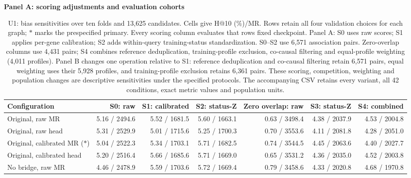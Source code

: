 \begin{landscape}
\begin{table}[p]
\centering\footnotesize
\setlength{\tabcolsep}{3pt}
\caption{U1: bias sensitivities over ten folds and 13,625 candidates. Cells give H@10 (\%)/MR. Rows retain all four validation choices for each graph; $\ast$ marks the prespecified primary. Every scoring column evaluates that row\textquotesingle s fixed checkpoint. Panel A: S0 uses raw scores; S1 applies per-gene calibration; S2 adds within-query training-status standardization. S0--S2 use 6,571 association pairs. Zero-overlap columns use 4,431 pairs; S4 combines reference deduplication, training-profile exclusion, co-causal filtering and equal-profile weighting (4,011 profiles). Panel B changes one operation relative to S1: reference deduplication and co-causal filtering retain 6,571 pairs, equal weighting uses their 5,928 profiles, and training-profile exclusion retains 6,361 pairs. These scoring, competition, weighting and population changes are descriptive sensitivities under the specified protocols. The accompanying CSV retains every variant, all 42 conditions, exact metric values and population units.}
\label{tab:matched_bias_U1}
\textbf{Panel A: scoring adjustments and evaluation cohorts}\par\smallskip
\begin{adjustbox}{max width=\linewidth}
\begin{tabular}{lrrrrrr}
\toprule
Configuration & S0: raw & S1: calibrated & S2: status-Z & Zero overlap: raw & S3: status-Z & S4: combined \\
\midrule
Original, raw MR & 5.16 / 2494.6 & 5.52 / 1681.5 & 5.60 / 1663.1 & 0.63 / 3498.4 & 4.38 / 2037.9 & 4.53 / 2004.8 \\
Original, raw head & 5.31 / 2529.9 & 5.01 / 1715.6 & 5.25 / 1700.3 & 0.70 / 3553.6 & 4.11 / 2081.8 & 4.28 / 2051.0 \\
Original, calibrated MR ($\ast$) & 5.04 / 2522.3 & 5.34 / 1703.1 & 5.71 / 1682.5 & 0.74 / 3544.5 & 4.45 / 2063.6 & 4.40 / 2027.7 \\
Original, calibrated head & 5.20 / 2516.4 & 5.66 / 1685.6 & 5.71 / 1669.0 & 0.65 / 3531.2 & 4.36 / 2035.0 & 4.52 / 2003.8 \\
No bridge, raw MR & 4.46 / 2478.9 & 5.59 / 1703.6 & 5.72 / 1669.4 & 0.79 / 3458.6 & 4.33 / 2020.8 & 4.68 / 1970.8 \\

\end{tabular}
\end{adjustbox}
\end{table}
\end{landscape}
